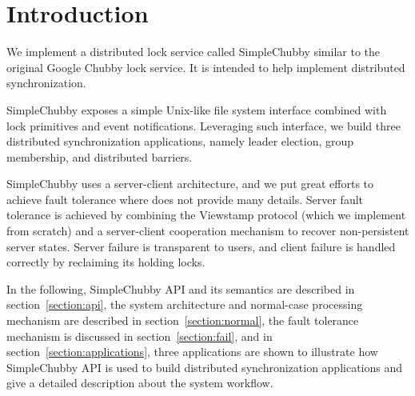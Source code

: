 \section{Introduction}

We implement a distributed lock service called SimpleChubby
similar to the original Google Chubby lock service\cite{burrows2006chubby}.
It is intended to help implement distributed synchronization.

SimpleChubby exposes a simple Unix-like file system interface
combined with lock primitives and event notifications.
Leveraging such interface, we build three distributed synchronization
applications, namely leader election, group membership, and distributed barriers.

SimpleChubby uses a server-client architecture,
and we put great efforts to achieve fault tolerance
where \cite{burrows2006chubby} does not provide many details.
Server fault tolerance is achieved by combining the Viewstamp protocol \cite{oki1988viewstamped}
(which we implement from scratch) and a server-client cooperation mechanism
to recover non-persistent server states.
Server failure is transparent to users, and client failure
is handled correctly by reclaiming its holding locks.

In the following,
SimpleChubby API and its semantics are described in section~\ref{section:api},
the system architecture and normal-case processing mechanism
are described in section~\ref{section:normal},
the fault tolerance mechanism is discussed in section~\ref{section:fail},
and in section~\ref{section:applications},
three applications are shown to illustrate
how SimpleChubby API is used to build
distributed synchronization applications
and give a detailed description about the system workflow.
